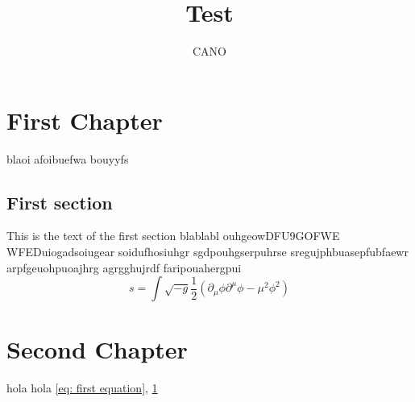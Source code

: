 \documentclass[pt=11]{scrbook}
\title{Test}
\author{CANO}
\begin{document}
	\maketitle
	\tableofcontents
	\newpage
	\chapter{First Chapter}\label{ch: first chapter}
	blaoi afoibuefwa bouyyfs
	\section{First section}
	This is the text of the first section blablabl ouhgeowDFU9GOFWE	 WFEDuiogadsoiugear soidufhosiuhgr sgdpouhgserpuhrse sregujphbuasepfubfaewr arpfgeuohpuoajhrg agrgghujrdf faripouahergpui
	\begin{equation}\label{eq: first equation}
		s=\int\sqrt{-g}\frac{1}{2}\left(\partial_\mu\phi\partial^\mu\phi-\mu^2\phi^2\right)
	\end{equation}
	\chapter{Second Chapter}
	hola hola \ref{eq: first equation}, \ref{ch: first chapter}
\end{document}
